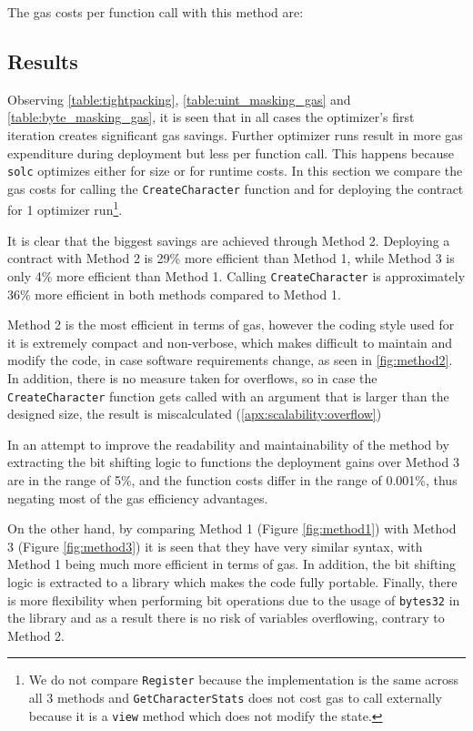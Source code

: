 The gas costs per function call with this method are: 


\subsection{Results}\label{ch:scalability:results}
Observing \ref{table:tightpacking}, \ref{table:uint_masking_gas} and \ref{table:byte_masking_gas},  it is seen that in all cases the optimizer's first iteration creates significant gas savings. Further optimizer runs result in more gas expenditure during deployment but less per function call. This happens because \texttt{solc} optimizes either for size or for runtime costs\cite{optimizer-tradeoff}. In this section we compare the gas costs for calling the \texttt{CreateCharacter} function and for deploying the contract for 1 optimizer run\footnote{We do not compare \texttt{Register} because the implementation is the same across all 3 methods and \texttt{GetCharacterStats} does not cost gas to call externally because it is a \texttt{view} method which does not modify the state.}. 



It is clear that the biggest savings are achieved through Method 2. Deploying a contract with Method 2 is 29\% more efficient than Method 1, while Method 3 is only 4\% more efficient than Method 1. Calling \texttt{CreateCharacter} is approximately 36\% more efficient in both methods compared to Method 1. 

Method 2 is the most efficient in terms of gas, however the coding style used for it is extremely compact and non-verbose, which makes difficult to maintain and modify the code, in case software requirements change, as seen in \ref{fig:method2}. In addition, there is no measure taken for overflows, so in case the \texttt{CreateCharacter} function gets called with an argument that is larger than the designed size, the result is miscalculated (\ref{apx:scalability:overflow}) 

In an attempt to improve the readability and maintainability of the method by extracting the bit shifting logic to functions the deployment gains over Method 3 are in the range of 5\%, and the function costs differ in the range of 0.001\%, thus negating most of the gas efficiency advantages.


On the other hand, by comparing Method 1 (Figure \ref{fig:method1}) with Method 3 (Figure \ref{fig:method3}) it is seen that they have very similar syntax, with Method 1 being much more efficient in terms of gas. In addition, the bit shifting logic is extracted to a library which makes the code fully portable. Finally, there is more flexibility when performing bit operations due to the usage of \texttt{bytes32} in the library and as a result there is no risk of variables overflowing, contrary to Method 2.

